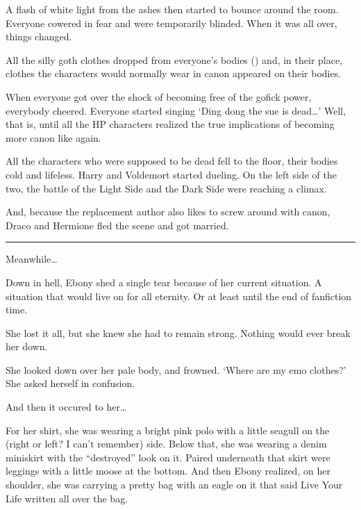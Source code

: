A flash of white light from the ashes then started to bounce around the room. Everyone cowered in fear and were temporarily blinded. When it was all over, things changed.

\begin{sloppypar}
    All the silly goth clothes dropped from everyone's bodies () and, in their place, clothes the characters would normally wear in canon appeared on their bodies.
\end{sloppypar}

\begin{sloppypar}
    When everyone got over the shock of becoming free of the gofick power, everybody cheered. Everyone started singing \enquote*{Ding dong the sue is dead\ldots{}} Well, that is, until all the HP characters realized the true implications of becoming more canon like again.
\end{sloppypar}

All the characters who were supposed to be dead fell to the floor, their bodies cold and lifeless. Harry and Voldemort started dueling. On the left side of the two, the battle of the Light Side and the Dark Side were reaching a climax.

\begin{sloppypar}
    And, because the replacement author also likes to screw around with canon, Draco and Hermione fled the scene and got married.
\end{sloppypar}

\rule{1in}{0.4pt}

Meanwhile\ldots{}

Down in hell, Ebony shed a single tear because of her current situation. A situation that would live on for all eternity. Or at least until the end of fanfiction time.

She lost it all, but she knew she had to remain strong. Nothing would ever break her down.

She looked down over her pale body, and frowned. \enquote*{Where are my emo clothes?} She asked herself in confusion.

And then it occured to her\ldots{}

For her shirt, she was wearing a bright pink polo with a little seagull on the (right or left? I can't remember) side. Below that, she was wearing a denim miniskirt with the \enquote{destroyed} look on it. Paired underneath that skirt were leggings with a little moose at the bottom. And then Ebony realized, on her shoulder, she was carrying a pretty bag with an eagle on it that said Live Your Life written all over the bag.

